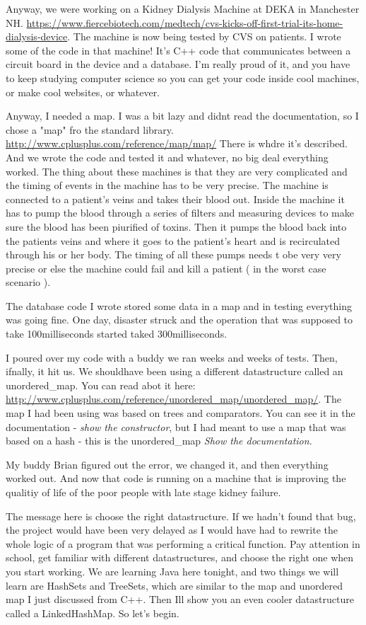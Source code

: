 \documentclass[12pt]{article}
\begin{document}
Anyway, we were working on a Kidney Dialysis Machine at DEKA in Manchester NH.
\url{https://www.fiercebiotech.com/medtech/cvs-kicks-off-first-trial-its-home-dialysis-device}. The machine is now being tested by CVS on patients. I wrote some of the code in that machine! It's C++ code that communicates between a circuit board in the device and a database. I'm really proud of it, and you have to keep studying computer science so you can get your code inside cool machines, or make cool websites, or whatever. 

Anyway, I needed a map. I was a bit lazy and didnt read the documentation, so I chose a "map" fro the standard library. \url{http://www.cplusplus.com/reference/map/map/} There is whdre it's described. And we wrote the code and tested it and whatever, no big deal everything worked. The thing about these machines is that they are very complicated and the timing of events in the machine has to be very precise. The machine is connected to a patient's veins and takes their blood out. Inside the machine it has to pump the blood through a series of filters and measuring devices to make sure the blood has been piurified of toxins. Then it pumps the blood back into the patients veins and where it goes to the patient's heart and is recirculated through his or her body. The timing of all these pumps needs t obe very very precise or else the machine could fail and kill a patient ( in the worst case scenario ).

The database code I wrote stored some data in a map and in testing everything was going fine. One day, disaster struck and the operation that was supposed to take 100milliseconds started taked 300milliseconds.

I poured over my code with a buddy we ran weeks and weeks of tests. Then, ifnally, it hit us. We shouldhave been using a different datastructure called an unordered\_map. You can read abot it here: \url{http://www.cplusplus.com/reference/unordered_map/unordered_map/}. The map I had been using was based on trees and comparators. You can see it in the documentation - \textit{show the constructor}, but I had meant to use a map that was based on a hash - this is the unordered\_map \textit{Show the documentation.}

My buddy Brian figured out the error, we changed it, and then everything worked out. And now that code is running on a machine that is improving the qualitiy of life of the poor people with late stage kidney failure. 

The message here is choose the right datastructure. If we hadn't found that bug, the project would have been very delayed as I would have had to rewrite the whole logic of a program that was performing a critical function. Pay attention in school, get familiar with different datastructures, and choose the right one when you start working. We are learning Java here tonight, and two things we will learn are HashSets and TreeSets, which are similar to the map and unordered map I just discussed from C++. Then Ill show you an even cooler datastructure called a LinkedHashMap. So let's begin.
\end{document}
